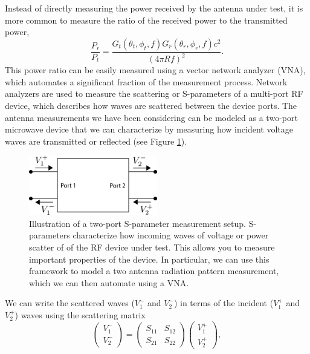 Instead of directly measuring the power received by the antenna under test, it is more common to measure the ratio of the received power to the transmitted power,
\begin{equation}
    \frac{P_r}{P_t} = \frac{G_t(\theta_t,\phi_t,f)G_r(\theta_r,\phi_r,f)c^2}{(4\pi Rf)^2}.
\end{equation}
This power ratio can be easily measured using a vector network analyzer (VNA), which automates a significant fraction of the measurement process. Network analyzers are used to measure the scattering or S-parameters of a multi-port RF device, which describes how waves are scattered between the device ports. The antenna measurements we have been considering can be modeled as a two-port microwave device that we can characterize by measuring how incident voltage waves are transmitted or reflected (see Figure \ref{fig:2port-scattering}).
\begin{figure}[htbp]
    \centering
    \includegraphics[width=0.5\textwidth]{figs/Chapter-5/230429_2port_scattering_figure.png}
    \caption{Illustration of a two-port S-parameter measurement setup. S-parameters characterize how incoming waves of voltage or power scatter of of the RF device under test. This allows you to measure important properties of the device. In particular, we can use this framework to model a two antenna radiation pattern measurement, which we can then automate using a VNA. }
    \label{fig:2port-scattering}
\end{figure}
We can write the scattered waves ($V_1^-$ and $V_2^-$) in terms of the incident ($V_1^+$ and $V_2^+$) waves using the scattering matrix
\begin{equation}
    \begin{pmatrix}
        V_1^-\\
        V_2^-
    \end{pmatrix} = 
    \begin{pmatrix}
        S_{11}&S_{12}\\
        S_{21}&S_{22}
    \end{pmatrix}
    \begin{pmatrix}
        V_1^+\\
        V_2^+
    \end{pmatrix},
\end{equation}

